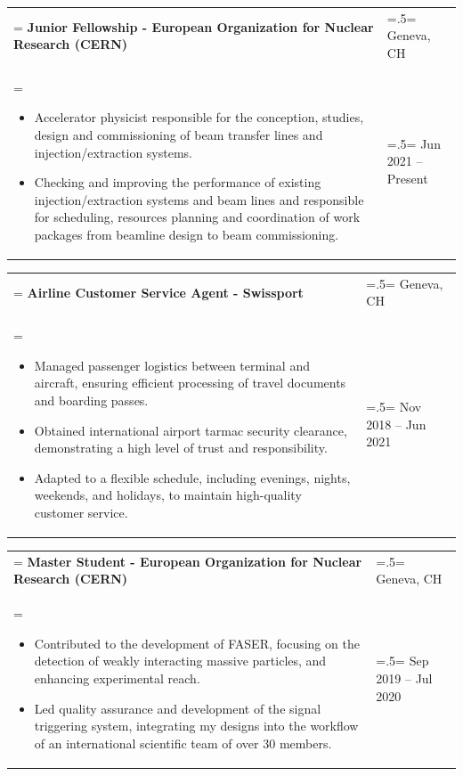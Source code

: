 \documentclass[letterpaper, 11pt]{article}
\begin{document}
\begin{tabularx}{1.0\textwidth} { 
   >{\raggedright\arraybackslash\hsize=1.5\hsize\linewidth=\hsize}X 
   >{\raggedleft\arraybackslash\hsize=.5\hsize\linewidth=\hsize}X }
\normalsize
\bf{Junior Fellowship - European Organization for Nuclear Research (CERN)} & Geneva, CH\\
\normalfont \begin{itemize}[leftmargin=*,noitemsep,topsep=0pt]
\item Accelerator physicist responsible for the conception, studies, design and commissioning of beam transfer lines and injection/extraction systems.
\item Checking and improving the performance of existing injection/extraction systems and beam lines and responsible for scheduling, resources planning and coordination of work packages from beamline design to beam commissioning.
\end{itemize} & Jun 2021 -- Present
\end{tabularx}

\begin{tabularx}{1.0\textwidth} { 
   >{\raggedright\arraybackslash\hsize=1.5\hsize\linewidth=\hsize}X 
   >{\raggedleft\arraybackslash\hsize=.5\hsize\linewidth=\hsize}X }
\normalsize
\bf{Airline Customer Service Agent - Swissport} & Geneva, CH\\
\normalfont \begin{itemize}[leftmargin=*,noitemsep,topsep=0pt]
\item Managed passenger logistics between terminal and aircraft, ensuring efficient processing of travel documents and boarding passes.
\item Obtained international airport tarmac security clearance, demonstrating a high level of trust and responsibility.
\item Adapted to a flexible schedule, including evenings, nights, weekends, and holidays, to maintain high-quality customer service.
\end{itemize} & Nov 2018 -- Jun 2021
\end{tabularx}

\begin{tabularx}{1.0\textwidth} { 
   >{\raggedright\arraybackslash\hsize=1.5\hsize\linewidth=\hsize}X 
   >{\raggedleft\arraybackslash\hsize=.5\hsize\linewidth=\hsize}X }
\normalsize
\bf{Master Student - European Organization for Nuclear Research (CERN)} & Geneva, CH\\
\normalfont \begin{itemize}[leftmargin=*,noitemsep,topsep=0pt]
\item Contributed to the development of FASER, focusing on the detection of weakly interacting massive particles, and enhancing experimental reach.
\item Led quality assurance and development of the signal triggering system, integrating my designs into the workflow of an international scientific team of over 30 members.
\end{itemize} & Sep 2019 -- Jul 2020
\end{tabularx}
\end{document}
